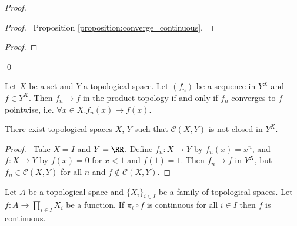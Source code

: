 \begin{proof}
    \pf
    \begin{proof}
        \pf\ Proposition \ref{proposition:converge_continuous}. %
    \end{proof}
    \begin{proof}
    \end{proof}
    \qed
\end{proof}

\begin{corollary}
    Let $X$ be a set and $Y$ a topological space. Let $(f_n)$ be a sequence in $Y^X$ and $f \in Y^X$.
    Then $f_n \rightarrow f$ in the product topology if and only if $f_n$ converges to $f$ pointwise,
    i.e. $\forall x \in X. f_n(x) \rightarrow f(x)$.
\end{corollary}

\begin{corollary}
    There exist topological spaces $X$, $Y$ such that $\mathcal{C}(X,Y)$ is not closed in $Y^X$.
\end{corollary}

\begin{proof}
    \pf\ Take $X = I$ and $Y = \RR$. Define $f_n : X \rightarrow Y$ by $f_n(x) = x^n$, and $f : X \rightarrow Y$ by
    $f(x) = 0$ for $x < 1$ and $f(1) = 1$. Then $f_n \rightarrow f$ in $Y^X$, but $f_n \in \mathcal{C}(X,Y)$ for all $n$
    and $f \notin \mathcal{C}(X,Y)$.
\end{proof}

\begin{theorem}
    \label{theorem:product_continuous}
        Let $A$ be a topological space and $\{ X_i \}_{i \in I}$ be a family of topological spaces. Let $f : A \rightarrow \prod_{i \in I} X_i$ be a function.
        If $\pi_i \circ f$ is continuous for all $i \in I$ then $f$ is continuous.
\end{theorem}


